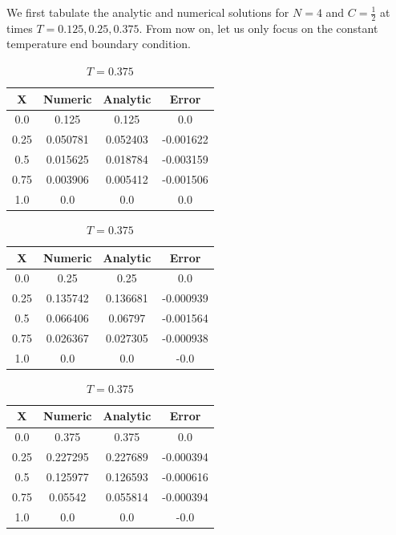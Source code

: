 \documentclass{article}
\begin{document}
We first tabulate the analytic and numerical solutions for \(N = 4\) and \(C = \frac{1}{2}\) at times \(T = 0.125, 0.25, 0.375\). From now on, let us only focus on the constant temperature end boundary condition.

\begin{table}[ht!]
    \centering
    \begin{tabular}{|c|c|c|c|}
        \hline
        X & Numeric & Analytic & Error \\
        \hline\hline
        0.0 & 0.125 & 0.125 & 0.0 \\
        0.25 & 0.050781 & 0.052403 & -0.001622 \\
        0.5 & 0.015625 & 0.018784 & -0.003159 \\
        0.75 & 0.003906 & 0.005412 & -0.001506 \\
        1.0 & 0.0 & 0.0 & 0.0 \\
        \hline 
    \end{tabular}
    \caption{\(T = 0.125\)}
    \bigskip\bigskip
    
    \begin{tabular}{|c|c|c|c|}
        \hline
        X & Numeric & Analytic & Error \\
        \hline\hline
        0.0 & 0.25 & 0.25 & 0.0 \\
        0.25 & 0.135742 & 0.136681 & -0.000939 \\
        0.5 & 0.066406 & 0.06797 & -0.001564 \\
        0.75 & 0.026367 & 0.027305 & -0.000938 \\
        1.0 & 0.0 & 0.0 & -0.0 \\
        \hline
    \end{tabular}
    \caption{\(T = 0.25\)}
    \bigskip\bigskip

    \begin{tabular}{|c|c|c|c|}
        \hline
        X & Numeric & Analytic & Error \\
        \hline\hline
        0.0 & 0.375 & 0.375 & 0.0 \\
        0.25 & 0.227295 & 0.227689 & -0.000394 \\
        0.5 & 0.125977 & 0.126593 & -0.000616 \\
        0.75 & 0.05542 & 0.055814 & -0.000394 \\
        1.0 & 0.0 & 0.0 & -0.0 \\
        \hline
    \end{tabular}
    \caption{\(T = 0.375\)}
\end{table}
\end{document}
